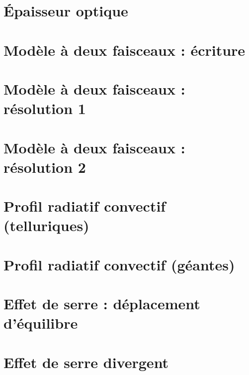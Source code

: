 \documentclass[a4paper,DIV16,10pt]{scrartcl}
\begin{document}
\newpage \section{\'Epaisseur optique} 

\newpage \section{Modèle à deux faisceaux : écriture} 

\newpage \section{Modèle à deux faisceaux : résolution 1} 

\newpage \section{Modèle à deux faisceaux : résolution 2} 

%

\newpage \section{Profil radiatif convectif (telluriques)} 

\newpage \section{Profil radiatif convectif (géantes)} 

\newpage \section{Effet de serre : déplacement d'équilibre} 

\newpage \section{Effet de serre divergent} 
\end{document}
